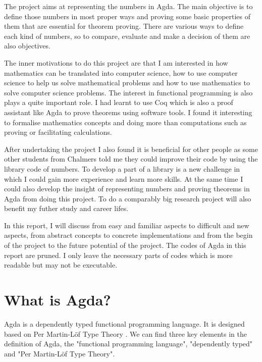 \documentclass{article}
\theoremstyle{definition}
\begin{document}
The project aims at representing the numbers in Agda. The main objective is to define those numbers in most proper ways and proving some basic properties of them that are essential for theorem proving. There are various ways to define each kind of numbers, so to compare, evaluate and make a decision of them are also objectives.

The inner motivations to do this project are that I am interested in how mathematics can be translated into computer science, how to use computer science to help us solve mathematical problems and how to use mathematics to solve computer science problems. The interest in functional programming is also plays a quite important role. I had learnt to use Coq which is also a proof 	assistant like Agda to prove theorems using software tools. I found it interesting to formalise mathematics concepts and doing more than computations such as proving or facilitating calculations.

After undertaking the project I also found it is beneficial for other people as some other students from Chalmers told me they could improve their code by using the library code of numbers. To develop a part of a library is a new challenge in which I could gain more experience and learn more skills. At the same time I could also develop the insight of representing numbers and proving theorems in Agda from doing this project. To do a comparably big research project will also benefit my futher study and career lifes.

In this report, I will discuss from easy and familiar aspects to difficult and new aspects, from abstract concepts to concrete implementations and from the begin of the project to the future potential of the project. The codes of Agda in this report are pruned. I only leave the necessary parts of codes which is more readable but may not be executable.

\section{What is Agda?}

Agda is a dependently typed functional programming language. It is designed based on Per Martin-Löf Type Theory \cite{agdawiki:main}. We can find three key elements in the definition of Agda, the "functional programming language", "dependently typed" and "Per Martin-Löf Type Theory".
\end{document}
